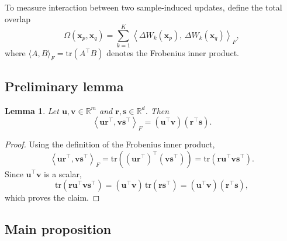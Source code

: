 \documentclass{article}
\newtheorem{lem}[thm]{Lemma}
\theoremstyle{definition}
\theoremstyle{remark}
\def\RR{\mathbb{R}}
\begin{document}
To measure interaction between two sample-induced updates, define the total overlap
\begin{equation}
\Omega(\mathbf{x}_p,\mathbf{x}_q)
=
\sum_{k=1}^{K}
\left\langle
\Delta W_k(\mathbf{x}_p),\,
\Delta W_k(\mathbf{x}_q)
\right\rangle_F,
\label{eq:overlap_def}
\end{equation}
where $\langle A,B\rangle_F = \mathrm{tr}(A^\top B)$ denotes the Frobenius inner product.

\subsection{Preliminary lemma}

\begin{lem}
\label{lem:rankone}
Let $\mathbf{u},\mathbf{v}\in\RR^{m}$ and $\mathbf{r},\mathbf{s}\in\RR^{d}$. Then
\begin{equation}
\left\langle \mathbf{u}\mathbf{r}^\top,\mathbf{v}\mathbf{s}^\top \right\rangle_F
=
(\mathbf{u}^\top \mathbf{v})(\mathbf{r}^\top \mathbf{s}).
\label{eq:rankone_identity}
\end{equation}
\end{lem}

\begin{proof}
Using the definition of the Frobenius inner product,
\[
\left\langle \mathbf{u}\mathbf{r}^\top,\mathbf{v}\mathbf{s}^\top \right\rangle_F
=
\mathrm{tr}\!\left((\mathbf{u}\mathbf{r}^\top)^\top(\mathbf{v}\mathbf{s}^\top)\right)
=
\mathrm{tr}\!\left(\mathbf{r}\mathbf{u}^\top \mathbf{v}\mathbf{s}^\top\right).
\]
Since $\mathbf{u}^\top \mathbf{v}$ is a scalar,
\[
\mathrm{tr}\!\left(\mathbf{r}\mathbf{u}^\top \mathbf{v}\mathbf{s}^\top\right)
=
(\mathbf{u}^\top \mathbf{v})\,\mathrm{tr}(\mathbf{r}\mathbf{s}^\top)
=
(\mathbf{u}^\top \mathbf{v})(\mathbf{r}^\top \mathbf{s}),
\]
which proves the claim.
\end{proof}

\subsection{Main proposition}
\end{document}
